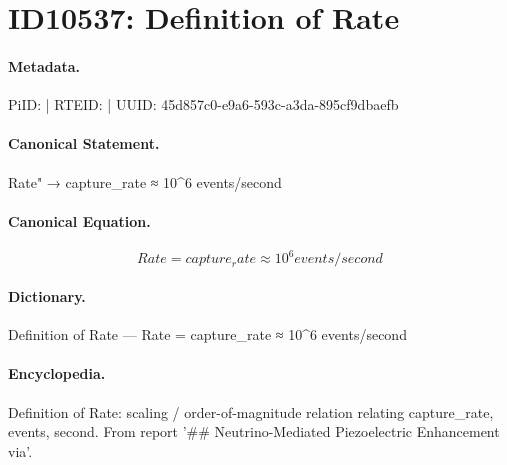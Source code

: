 \section*{ID10537: Definition of Rate}
\paragraph{Metadata.}
PiID:  | RTEID:  | UUID: 45d857c0-e9a6-593c-a3da-895cf9dbaefb

\paragraph{Canonical Statement.}
Rate" → capture\_rate ≈ 10\textasciicircum{}6 events/second

\paragraph{Canonical Equation.}
\[
Rate = capture_rate ≈ 10^6 events/second
\]

\paragraph{Dictionary.}
Definition of Rate — Rate = capture\_rate ≈ 10\textasciicircum{}6 events/second

\paragraph{Encyclopedia.}
Definition of Rate: scaling / order-of-magnitude relation relating capture\_rate, events, second. From report '\#\# Neutrino-Mediated Piezoelectric Enhancement via'.
